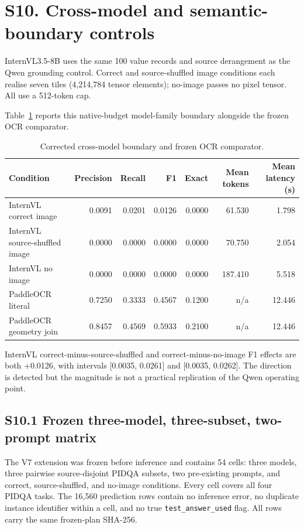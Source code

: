 \documentclass[11pt]{article}
\begin{document}
\section*{S10. Cross-model and semantic-boundary controls}

InternVL3.5-8B uses the same 100 value records and source derangement as the
Qwen grounding control. Correct and source-shuffled image conditions each
realise seven tiles (4,214,784 tensor elements); no-image passes no pixel
tensor. All use a 512-token cap.

Table~\ref{tab:s10_boundary} reports this native-budget model-family boundary
alongside the frozen OCR comparator.

\begin{table}[H]
\centering
\caption{Corrected cross-model boundary and frozen OCR comparator.}
\label{tab:s10_boundary}
\scriptsize
\begin{tabular}{lrrrrrr}
\toprule
Condition & Precision & Recall & F1 & Exact & Mean tokens & Mean latency (s) \\
\midrule
InternVL correct image & 0.0091 & 0.0201 & 0.0126 & 0.0000 & 61.530 & 1.798 \\
InternVL source-shuffled image & 0.0000 & 0.0000 & 0.0000 & 0.0000 & 70.750 & 2.054 \\
InternVL no image & 0.0000 & 0.0000 & 0.0000 & 0.0000 & 187.410 & 5.518 \\
PaddleOCR literal & 0.7250 & 0.3333 & 0.4567 & 0.1200 & n/a & 12.446 \\
PaddleOCR geometry join & 0.8457 & 0.4569 & 0.5933 & 0.2100 & n/a & 12.446 \\
\bottomrule
\end{tabular}
\end{table}

InternVL correct-minus-source-shuffled and correct-minus-no-image F1 effects
are both +0.0126, with intervals [0.0035, 0.0261] and [0.0035, 0.0262].
The direction is detected but the magnitude is not a practical replication of
the Qwen operating point.

\subsection*{S10.1 Frozen three-model, three-subset, two-prompt matrix}

The V7 extension was frozen before inference and contains 54 cells: three
models, three pairwise source-disjoint PIDQA subsets, two pre-existing prompts,
and correct, source-shuffled, and no-image conditions. Every cell covers all
four PIDQA tasks. The 16,560 prediction rows contain no inference error, no
duplicate instance identifier within a cell, and no true
\texttt{test\_answer\_used} flag. All rows carry the same frozen-plan SHA-256.
\end{document}
